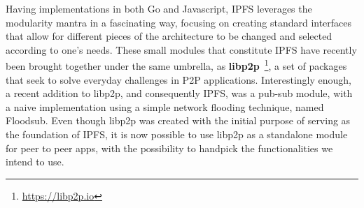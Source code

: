 Having implementations in both Go and Javascript, IPFS leverages the modularity
mantra in a fascinating way, focusing on creating standard interfaces that allow
for different pieces of the architecture to be changed and selected according
to one's needs. These small modules that constitute IPFS have recently been
brought together under the same umbrella, as
\textbf{libp2p}~\footnote{\url{https://libp2p.io}}, a set of packages that seek
to solve everyday challenges in P2P applications. Interestingly enough, a recent
addition to libp2p, and consequently IPFS, was a pub-sub module,
with a naive implementation using a simple network flooding technique, named
Floodsub. Even though libp2p was created with the initial purpose of serving as
the foundation of IPFS, it is now possible to use libp2p as a
standalone module for peer to peer apps, with the possibility to handpick the
functionalities we intend to use.
